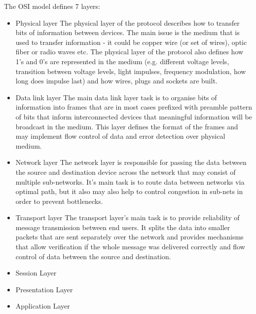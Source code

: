 \documentclass[magisterska,en]{pracamgr}
\begin{document}
The OSI model defines 7 layers:
\begin{itemize}
 \item Physical layer
 The physical layer of the protocol describes how to transfer bits of information between devices. The main issue is the medium that is used to transfer information - it could be copper wire (or set of wires), optic fiber or radio waves etc. The physical layer of the protocol also defines how 1's and 0's are represented in the medium (e.g. different voltage levels, transition between voltage levels, light impulses, frequency modulation, how long does impulse last) and how wires, plugs and sockets are built.
 \item Data link layer
 The main data link layer task is to organise bits of information into frames that are in most cases prefixed with preamble pattern of bits that inform interconnected devices that meaningful information will be broadcast in the medium. This layer defines the format of the frames and may implement flow control of data and error detection over physical medium.
 \item Network layer
 The network layer is responsible for passing the data between the source and destination device across the network that may consist of multiple sub-networks. It's main task is to route data between networks via optimal path, but it also may also help to control congestion in sub-nets in order to prevent bottlenecks.
 \item Transport layer
 The transport layer's main task is to provide reliability of message transmission between end users. It splits the data into smaller packets that are sent separately over the network and provides mechanisms that allow verification if the whole message was delivered correctly and flow control of data between the source and destination.
 \item Session Layer
 \item Presentation Layer
 \item Application Layer
\end{itemize}
\end{document}

